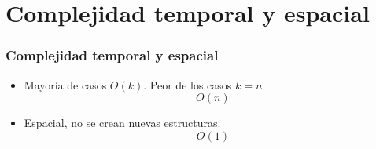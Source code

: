 \documentclass[17pt, t, lualatex]{beamer}
\begin{document}
\section{Complejidad temporal y espacial}

\insertsectionpage

\begin{frame}
  \frametitle{Complejidad temporal y espacial}

  \begin{itemize}
    \item Mayoría de casos $O(k)$. Peor de los casos $k = n$
          \[
          O(n)
          \]
    \item Espacial, no se crean nuevas estructuras.
          \[O(1)\]
  \end{itemize}

\end{frame}






\insertendpage
\end{document}
